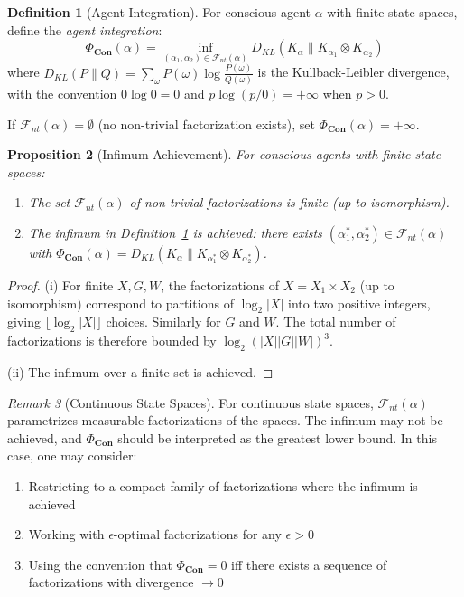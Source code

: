 \documentclass[11pt,a4paper]{article}
\theoremstyle{definition}
\newtheorem{definition}{Definition}[section]
\theoremstyle{plain}
\newtheorem{proposition}[definition]{Proposition}
\theoremstyle{remark}
\newtheorem{remark}[definition]{Remark}
\newcommand{\Con}{\mathbf{Con}}
\begin{document}
\begin{definition}[Agent Integration]\label{def:agent-integration}
For conscious agent $\alpha$ with finite state spaces, define the \emph{agent integration}:
\[
\Phi_{\Con}(\alpha) = \inf_{(\alpha_1, \alpha_2) \in \mathcal{F}_{nt}(\alpha)} D_{KL}(K_\alpha \| K_{\alpha_1} \otimes K_{\alpha_2})
\]
where $D_{KL}(P \| Q) = \sum_\omega P(\omega) \log \frac{P(\omega)}{Q(\omega)}$ is the Kullback-Leibler divergence, with the convention $0 \log 0 = 0$ and $p \log(p/0) = +\infty$ when $p > 0$.

If $\mathcal{F}_{nt}(\alpha) = \emptyset$ (no non-trivial factorization exists), set $\Phi_{\Con}(\alpha) = +\infty$.
\end{definition}

\begin{proposition}[Infimum Achievement]\label{prop:infimum-achievement}
For conscious agents with finite state spaces:
\begin{enumerate}[label=(\roman*)]
    \item The set $\mathcal{F}_{nt}(\alpha)$ of non-trivial factorizations is finite (up to isomorphism).
    \item The infimum in Definition~\ref{def:agent-integration} is achieved: there exists $(\alpha_1^*, \alpha_2^*) \in \mathcal{F}_{nt}(\alpha)$ with $\Phi_{\Con}(\alpha) = D_{KL}(K_\alpha \| K_{\alpha_1^*} \otimes K_{\alpha_2^*})$.
\end{enumerate}
\end{proposition}

\begin{proof}
(i) For finite $X, G, W$, the factorizations of $X = X_1 \times X_2$ (up to isomorphism) correspond to partitions of $\log_2|X|$ into two positive integers, giving $\lfloor \log_2|X| \rfloor$ choices. Similarly for $G$ and $W$. The total number of factorizations is therefore bounded by $\log_2(|X||G||W|)^3$.

(ii) The infimum over a finite set is achieved.
\end{proof}

\begin{remark}[Continuous State Spaces]
For continuous state spaces, $\mathcal{F}_{nt}(\alpha)$ parametrizes measurable factorizations of the spaces. The infimum may not be achieved, and $\Phi_{\Con}$ should be interpreted as the greatest lower bound. In this case, one may consider:
\begin{enumerate}[label=(\roman*)]
    \item Restricting to a compact family of factorizations where the infimum is achieved
    \item Working with $\epsilon$-optimal factorizations for any $\epsilon > 0$
    \item Using the convention that $\Phi_{\Con} = 0$ iff there exists a sequence of factorizations with divergence $\to 0$
\end{enumerate}
\end{remark}
\end{document}
